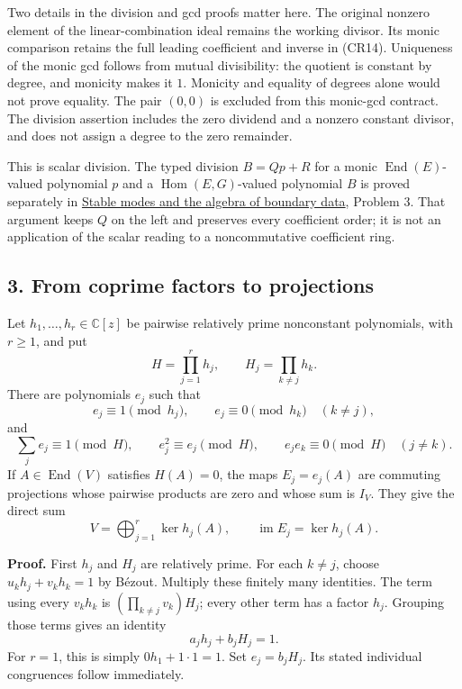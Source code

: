 \documentclass[
  11pt,
]{article}
\begin{document}
Two details in the division and gcd proofs matter here. The original
nonzero element of the linear-combination ideal remains the working
divisor. Its monic comparison retains the full leading coefficient and
inverse in (CR14). Uniqueness of the monic gcd follows from mutual
divisibility: the quotient is constant by degree, and monicity makes it
\(1\). Monicity and equality of degrees alone would not prove equality.
The pair \((0,0)\) is excluded from this monic-gcd contract. The
division assertion includes the zero dividend and a nonzero constant
divisor, and does not assign a degree to the zero remainder.

This is scalar division. The typed division \(B=Qp+R\) for a monic
\(\operatorname{End}(E)\)-valued polynomial \(p\) and a
\(\operatorname{Hom}(E,G)\)-valued polynomial \(B\) is proved separately
in \href{stable-boundary-models.pdf}{Stable modes and the algebra of
boundary data}, Problem 3. That argument keeps \(Q\) on the left and
preserves every coefficient order; it is not an application of the
scalar reading to a noncommutative coefficient ring.

\subsection{3. From coprime factors to
projections}\label{from-coprime-factors-to-projections}

Let \(h_1,\ldots,h_r\in\mathbb C[z]\) be pairwise relatively prime
nonconstant polynomials, with \(r\geq1\), and put \[
H=\prod_{j=1}^r h_j,\qquad H_j=\prod_{k\ne j}h_k.
\] There are polynomials \(e_j\) such that \[
e_j\equiv1\pmod {h_j},\qquad e_j\equiv0\pmod {h_k}\quad(k\ne j),
\] and \[
\sum_j e_j\equiv1\pmod H,\qquad
e_j^2\equiv e_j\pmod H,\qquad e_je_k\equiv0\pmod H\quad(j\ne k).
\] If \(A\in\operatorname{End}(V)\) satisfies \(H(A)=0\), the maps
\(E_j=e_j(A)\) are commuting projections whose pairwise products are
zero and whose sum is \(I_V\). They give the direct sum \[
V=\bigoplus_{j=1}^r\ker h_j(A),\qquad
\operatorname{im}E_j=\ker h_j(A).
\]

\textbf{Proof.} First \(h_j\) and \(H_j\) are relatively prime. For each
\(k\ne j\), choose \(u_kh_j+v_kh_k=1\) by Bézout. Multiply these
finitely many identities. The term using every \(v_kh_k\) is
\((\prod_{k\ne j}v_k)H_j\); every other term has a factor \(h_j\).
Grouping those terms gives an identity \[
a_jh_j+b_jH_j=1.
\] For \(r=1\), this is simply \(0h_1+1\cdot1=1\). Set \(e_j=b_jH_j\).
Its stated individual congruences follow immediately.
\end{document}
